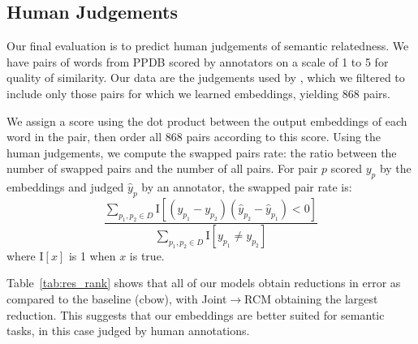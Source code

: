 \documentclass[11pt]{article}
\newcommand{\secref}[1]{Section~\ref{#1}}
\newcommand{\tableref}[1]{Table~\ref{#1}}
\begin{document}
%


\subsection{Human Judgements}
\label{ssec:exp_rank}
Our final evaluation is to predict human judgements of semantic relatedness.
We have pairs of words from PPDB scored by annotators
on a scale of 1 to 5 for quality of similarity. Our data are the judgements used by
, which we filtered to include only those
pairs for which we learned embeddings, yielding 868 pairs.

We assign a score using the dot product between the output embeddings of each word in the pair,
then order all 868 pairs according to this score. Using the human judgements, we compute 
the swapped pairs rate:
the ratio between the number of swapped pairs and the number of all pairs.
For pair $p$ scored $y_p$ by the embeddings and judged $\hat{y}_p$ by an annotator, the swapped pair rate is:
\begin{equation}
\frac{\sum_{p_1,p_2 \in D} \textrm{I}[\left( y_{p_1} - y_{p_2}\right) \left( \hat{y}_{p_2} - \hat{y}_{p_1} \right) < 0] }{\sum_{p_1,p_2 \in D} \textrm{I}[y_{p_1} \ne y_{p_2}]}
\end{equation}
\noindent where $\textrm{I}[x]$ is 1 when $x$ is true.

\tableref{tab:res_rank} shows that all of our
models obtain reductions in error as compared to the baseline (cbow),
with Joint$\rightarrow$RCM obtaining the largest reduction.
This suggests that our embeddings are better suited for semantic tasks, in this case
judged by human annotations.
\end{document}
